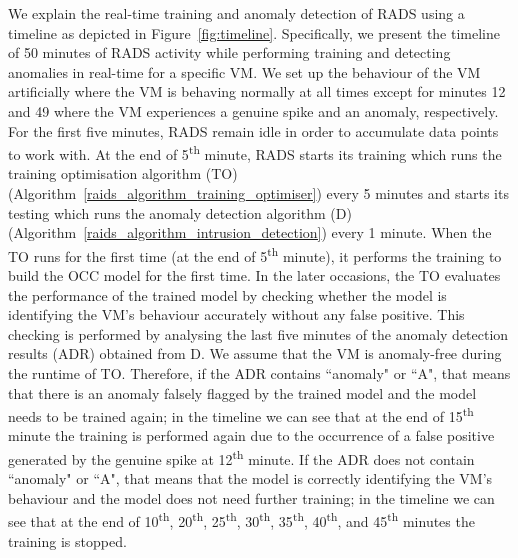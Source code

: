 We explain the real-time training and anomaly detection of RADS using a timeline as depicted in Figure~\ref{fig:timeline}. Specifically, we present the timeline of 50 minutes of RADS activity while performing training and detecting anomalies in real-time for a specific VM. We set up the behaviour of the VM artificially where the VM is behaving normally at all times except for minutes 12 and 49 where the VM experiences a genuine spike and an anomaly, respectively. For the first five minutes, RADS remain idle in order to accumulate data points to work with. At the end of 5\textsuperscript{th} minute, RADS starts its training which runs the training optimisation algorithm (TO) (Algorithm~\ref{raids_algorithm_training_optimiser}) every 5 minutes and starts its testing which runs the anomaly detection algorithm (D) (Algorithm~\ref{raids_algorithm_intrusion_detection}) every 1 minute. 
When the TO runs for the first time (at the end of 5\textsuperscript{th} minute), it performs the training to build the OCC model for the first time. In the later occasions, the TO evaluates the performance of the trained model by checking whether the model is identifying the VM's behaviour accurately without any false positive. 
This checking is performed by analysing the last five minutes of the anomaly detection results (ADR) obtained from D.
We assume that the VM is anomaly-free during the runtime of TO. 
Therefore, if the ADR contains ``anomaly" or ``A", that means that there is an anomaly falsely flagged by the trained model and the model needs to be trained again; in the timeline we can see that at the end of 15\textsuperscript{th} minute the training is performed again due to the occurrence of a false positive generated by the genuine spike at 12\textsuperscript{th} minute.
If the ADR does not contain ``anomaly" or ``A", that means that the model is correctly identifying the VM's behaviour and the model does not need further training; in the timeline we can see that at the end of 10\textsuperscript{th}, 20\textsuperscript{th}, 25\textsuperscript{th}, 30\textsuperscript{th}, 35\textsuperscript{th}, 40\textsuperscript{th}, and 45\textsuperscript{th} minutes the training is stopped. 

